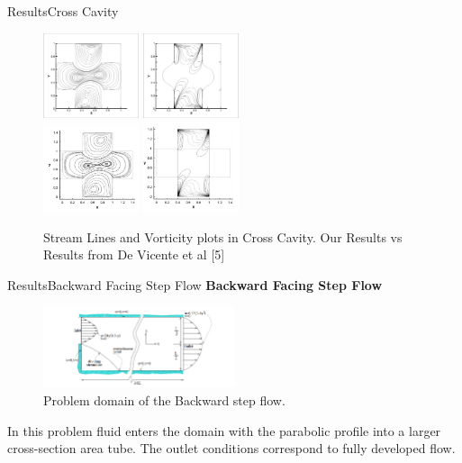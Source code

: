 \documentclass[11pt]{beamer}
\begin{document}
\begin{frame}{Results}{Cross Cavity}
\begin{figure}[hH]
\includegraphics[width=0.25\textwidth]{images/jesus/re200psi}\hspace{1cm}
\includegraphics[width=0.25\textwidth]{images/jesus/re200omega}\\
\includegraphics[width=0.25\textwidth]{images/jesus/re200psiP}\hspace{1cm}
\includegraphics[width=0.25\textwidth]{images/jesus/re200omegaP}
\caption{Stream Lines and Vorticity plots in Cross Cavity. Our Results vs Results from De Vicente et al [5]}
\end{figure}
\end{frame}








\begin{frame}{Results}{Backward Facing Step Flow}
\textbf{Backward Facing Step Flow}\linebreak

\begin{figure}[hH]
\includegraphics[width=0.5\textwidth]{images/l30l/domain}
\caption{Problem domain of the Backward step flow.}
\end{figure}
In this problem fluid enters the domain with the parabolic profile into a larger cross-section area tube. The outlet conditions correspond to fully developed flow.
\end{frame}
\end{document}
